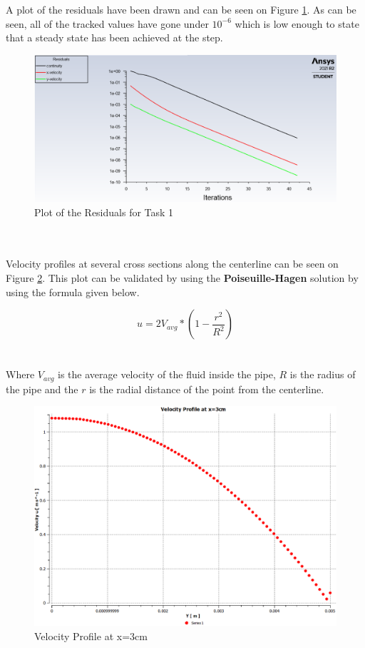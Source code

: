\noindent A plot of the residuals have been drawn and can be seen on Figure \ref{fig:residuals}. As can be seen, 
all of the tracked values have gone under $10^{-6}$ which is low enough to state that a steady state has been achieved at the step.

\begin{figure}[H]
    \centering
    \includegraphics[width=15cm]{images/task1/residuals.png}
    \caption{Plot of the Residuals for Task 1}
    \label{fig:residuals}
\end{figure}
\\
\\
\noindent Velocity profiles at several cross sections along the centerline can be seen on Figure \ref{fig:velprof3}. This plot can be validated by using the \textbf{Poiseuille-Hagen} solution by using the formula given below. 

\begin{equation}
    u = 2V_{avg} * (1- \frac{r^{2}}{R^{2}})
    \label{eq:hagen}
\end{equation}
\\
\\
\noindent Where $V_{avg}$ is the average velocity of the fluid inside the pipe, $R$ is the radius of the pipe 
and the $r$ is the radial distance of the point from the centerline.

\begin{figure}[H]
    \centering
    \includegraphics[width=14cm]{images/task1/vel_prof_3.png}
    \caption{Velocity Profile at x=3cm}
    \label{fig:velprof3}
\end{figure}

